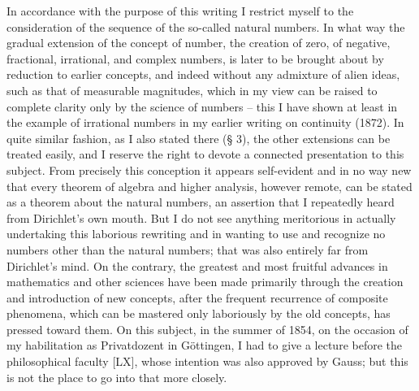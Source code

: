 \documentclass[11pt]{article}
\begin{document}
In accordance with the purpose of this writing I restrict myself to the consideration of the sequence of the so-called natural numbers. In what way the gradual extension of the concept of number, the creation of zero, of negative, fractional, irrational, and complex numbers, is later to be brought about by reduction to earlier concepts, and indeed without any admixture of alien ideas, such as that of measurable magnitudes, which in my view can be raised to complete clarity only by the science of numbers -- this I have shown at least in the example of irrational numbers in my earlier writing on continuity (1872). In quite similar fashion, as I also stated there (§ 3), the other extensions can be treated easily, and I reserve the right to devote a connected presentation to this subject. From precisely this conception it appears self-evident and in no way new that every theorem of algebra and higher analysis, however remote, can be stated as a theorem about the natural numbers, an assertion that I repeatedly heard from Dirichlet's own mouth. But I do not see anything meritorious in actually undertaking this laborious rewriting and in wanting to use and recognize no numbers other than the natural numbers; that was also entirely far from Dirichlet's mind. On the contrary, the greatest and most fruitful advances in mathematics and other sciences have been made primarily through the creation and introduction of new concepts, after the frequent recurrence of composite phenomena, which can be mastered only laboriously by the old concepts, has pressed toward them. On this subject, in the summer of 1854, on the occasion of my habilitation as Privatdozent in Göttingen, I had to give a lecture before the philosophical faculty [LX], whose intention was also approved by Gauss; but this is not the place to go into that more closely.
\end{document}
